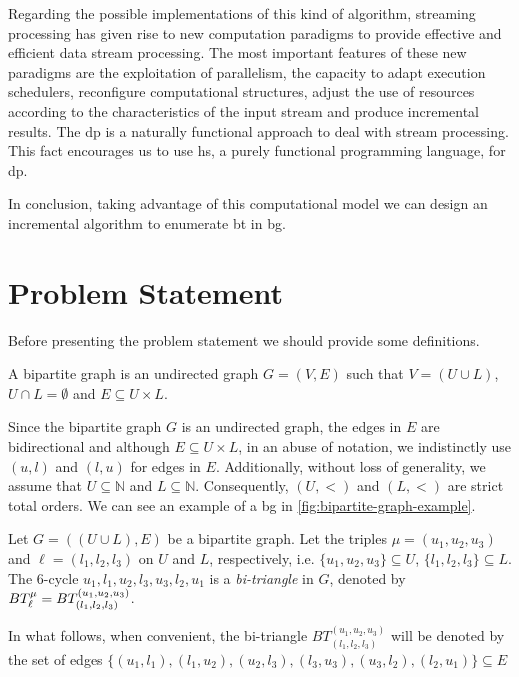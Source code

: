 Regarding the possible implementations of this kind of algorithm, streaming processing has given rise to new computation paradigms to provide effective and efficient data stream processing.
The most important features of these new paradigms are the exploitation of parallelism, the capacity to adapt execution schedulers, 
reconfigure computational structures, adjust the use of resources according to the characteristics of the input stream and produce incremental results. 
The \acrfull{dp} is a naturally functional approach to deal with stream processing. 
This fact encourages us to use \acrlong{hs}, a purely functional programming language, for \acrshort{dp}.

In conclusion, taking advantage of this computational model we can design an incremental algorithm to enumerate \acrshort{bt} in \acrshort{bg}.

\section{Problem Statement}
Before presenting the problem statement we should provide some definitions.

\begin{definition}[\acrlong{bg}] 
A bipartite graph is an undirected graph $G=(V,E)$  such that $V=(U\cup L)$, $U\cap L=\emptyset$ and $E\subseteq U\times L$.\cite{Bondy1976}
\end{definition}

Since the bipartite graph $G$ is an undirected graph, the edges in $E$ are bidirectional and although $E\subseteq U\times L$, in an abuse of notation, we indistinctly use $(u,l)$ and $(l,u)$ for edges in $E$. Additionally, 
without loss of generality, we assume that  $U\subseteq \mathbb{N}$ and $L\subseteq \mathbb{N}$. Consequently, $(U,<)$  and $(L,<)$ are strict total orders. We can see an example of a \acrshort{bg}
in \autoref{fig:bipartite-graph-example}.



%
\begin{definition}[\acrlong{bt}]
Let $G=((U\cup L),E)$ be a bipartite graph. Let the triples $\mu=(u_1, u_2, u_3)$ and $\ell=(l_1, l_2,l_3)$ on $U$ and $L$, respectively, i.e.  $\{u_1, u_2, u_3\} \subseteq U$, $\{l_1, l_2,l_3\} \subseteq L$. 
The 6-cycle $u_1,l_1,u_2,l_3,u_3,l_2,u_1$  is a \textit{bi-triangle} in $G$, denoted by $BT_{\ell}^{\mu} = BT_{(l_1, l_2,l_3)}^{(u_1, u_2, u_3)}$. 
\end{definition}

In what follows, when convenient, the bi-triangle $BT_{(l_1,l_2,l_3)}^{(u_1,u_2,u_3)}$  will be denoted by the set of edges $\{(u_1, l_1), (l_1,u_2), (u_2, l_3), (l_3,u_3), (u_3, l_2), (l_2,u_1)\} \subseteq E$

